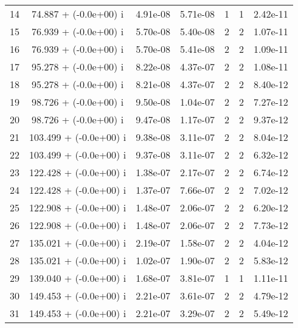 \begin{table}[H]
\begin{center}
\begin{tabular}{|c|c|c|c|c|c|c|}
    14  &     74.887 + (-0.0e+00) i  &    4.91e-08      &   5.71e-08    &   1    &  1   &    2.42e-11 \\
    15  &     76.939 + (-0.0e+00) i  &    5.70e-08      &   5.40e-08    &   2    &  2   &    1.07e-11 \\
    16  &     76.939 + (-0.0e+00) i  &    5.70e-08      &   5.41e-08    &   2    &  2   &    1.09e-11 \\
    17  &     95.278 + (-0.0e+00) i  &    8.22e-08      &   4.37e-07    &   2    &  2   &    1.08e-11 \\
    18  &     95.278 + (-0.0e+00) i  &    8.21e-08      &   4.37e-07    &   2    &  2   &    8.40e-12 \\
    19  &     98.726 + (-0.0e+00) i  &    9.50e-08      &   1.04e-07    &   2    &  2   &    7.27e-12 \\
    20  &     98.726 + (-0.0e+00) i  &    9.47e-08      &   1.17e-07    &   2    &  2   &    9.37e-12 \\
    21  &    103.499 + (-0.0e+00) i  &    9.38e-08      &   3.11e-07    &   2    &  2   &    8.04e-12 \\
    22  &    103.499 + (-0.0e+00) i  &    9.37e-08      &   3.11e-07    &   2    &  2   &    6.32e-12 \\
    23  &    122.428 + (-0.0e+00) i  &    1.38e-07      &   2.17e-07    &   2    &  2   &    6.74e-12 \\
    24  &    122.428 + (-0.0e+00) i  &    1.37e-07      &   7.66e-07    &   2    &  2   &    7.02e-12 \\
    25  &    122.908 + (-0.0e+00) i  &    1.48e-07      &   2.06e-07    &   2    &  2   &    6.20e-12 \\
    26  &    122.908 + (-0.0e+00) i  &    1.48e-07      &   2.06e-07    &   2    &  2   &    7.73e-12 \\
    27  &    135.021 + (-0.0e+00) i  &    2.19e-07      &   1.58e-07    &   2    &  2   &    4.04e-12 \\
    28  &    135.021 + (-0.0e+00) i  &    1.02e-07      &   1.90e-07    &   2    &  2   &    5.83e-12 \\
    29  &    139.040 + (-0.0e+00) i  &    1.68e-07      &   3.81e-07    &   1    &  1   &    1.11e-11 \\
    30  &    149.453 + (-0.0e+00) i  &    2.21e-07      &   3.61e-07    &   2    &  2   &    4.79e-12 \\
    31  &    149.453 + (-0.0e+00) i  &    2.21e-07      &   3.29e-07    &   2    &  2   &    5.49e-12 \\

\end{tabular}
\end{center}
\end{table}
